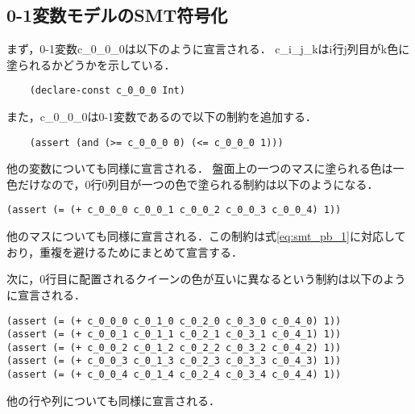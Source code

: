


\subsection{0-1変数モデルのSMT符号化}\label{sec:pro_pb}

%
%
まず，0-1変数c\_0\_0\_0は以下のように宣言される．
c\_i\_j\_kはi行j列目がk色に塗られるかどうかを示している．
{ \scriptsize \begin{verbatim}
    (declare-const c_0_0_0 Int)
\end{verbatim}}
また，c\_0\_0\_0は0-1変数であるので以下の制約を追加する．
{ \scriptsize \begin{verbatim}
    (assert (and (>= c_0_0_0 0) (<= c_0_0_0 1)))
\end{verbatim}}
他の変数についても同様に宣言される．
盤面上の一つのマスに塗られる色は一色だけなので，0行0列目が一つの色で塗られる制約は以下のようになる．
{ \scriptsize \begin{verbatim}
(assert (= (+ c_0_0_0 c_0_0_1 c_0_0_2 c_0_0_3 c_0_0_4) 1))
\end{verbatim}}
他のマスについても同様に宣言される．この制約は式\ref{eq:smt_pb_1}に対応しており，重複を避けるためにまとめて宣言する．

次に，0行目に配置されるクイーンの色が互いに異なるという制約は以下のように宣言される．
{ \scriptsize \begin{verbatim}
(assert (= (+ c_0_0_0 c_0_1_0 c_0_2_0 c_0_3_0 c_0_4_0) 1))
(assert (= (+ c_0_0_1 c_0_1_1 c_0_2_1 c_0_3_1 c_0_4_1) 1))
(assert (= (+ c_0_0_2 c_0_1_2 c_0_2_2 c_0_3_2 c_0_4_2) 1))
(assert (= (+ c_0_0_3 c_0_1_3 c_0_2_3 c_0_3_3 c_0_4_3) 1))
(assert (= (+ c_0_0_4 c_0_1_4 c_0_2_4 c_0_3_4 c_0_4_4) 1))
\end{verbatim}}
他の行や列についても同様に宣言される．

